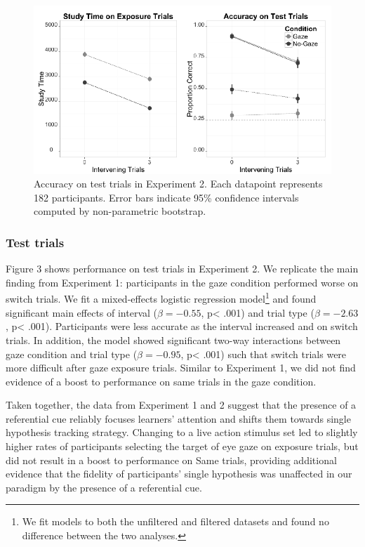 \documentclass[12pt,]{article}
\let\rmarkdownfootnote\footnote%
\def\footnote{\protect\rmarkdownfootnote}
\begin{document}
\begin{figure}[htbp]
\centering
\includegraphics{figs/expt2 plot-1.pdf}
\caption{Accuracy on test trials in Experiment 2. Each datapoint
represents 182 participants. Error bars indicate 95\% confidence
intervals computed by non-parametric bootstrap.}
\end{figure}

\subsubsection{Test trials}\label{test-trials-1}

Figure 3 shows performance on test trials in Experiment 2. We replicate
the main finding from Experiment 1: participants in the gaze condition
performed worse on switch trials. We fit a mixed-effects logistic
regression model\footnote{We fit models to both the unfiltered and
  filtered datasets and found no difference between the two analyses.}
and found significant main effects of interval (\(\beta = -0.55\),
p\textless{} .001) and trial type (\(\beta = -2.63\), p\textless{}
.001). Participants were less accurate as the interval increased and on
switch trials. In addition, the model showed significant two-way
interactions between gaze condition and trial type (\(\beta = -0.95\),
p\textless{} .001) such that switch trials were more difficult after
gaze exposure trials. Similar to Experiment 1, we did not find evidence
of a boost to performance on same trials in the gaze condition.

Taken together, the data from Experiment 1 and 2 suggest that the
presence of a referential cue reliably focuses learners' attention and
shifts them towards single hypothesis tracking strategy. Changing to a
live action stimulus set led to slightly higher rates of participants
selecting the target of eye gaze on exposure trials, but did not result
in a boost to performance on Same trials, providing additional evidence
that the fidelity of participants' single hypothesis was unaffected in
our paradigm by the presence of a referential cue.
\end{document}
